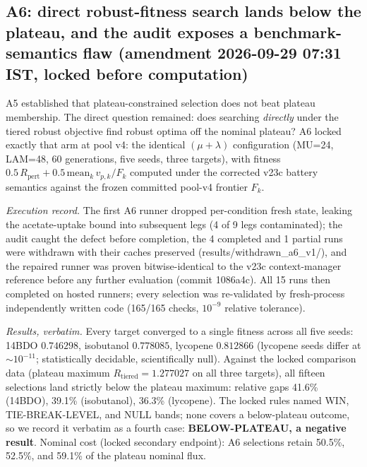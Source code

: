 \documentclass[12pt,a4paper]{article}
\begin{document}

\subsection{A6: direct robust-fitness search lands below the plateau, and the audit exposes a benchmark-semantics flaw (amendment 2026-09-29 07:31 IST, locked before computation)}
\label{sec:a6}

A5 established that plateau-constrained selection does not beat plateau membership. The direct question remained: does searching \emph{directly} under the tiered robust objective find robust optima off the nominal plateau? A6 locked exactly that arm at pool v4: the identical $(\mu{+}\lambda)$ configuration (MU=24, LAM=48, 60 generations, five seeds, three targets), with fitness $0.5\,R_{\mathrm{pert}} + 0.5\,\mathrm{mean}_k\, v_{p,k}/F_k$ computed under the corrected v23c battery semantics against the frozen committed pool-v4 frontier $F_k$.

\textit{Execution record.} The first A6 runner dropped per-condition fresh state, leaking the acetate-uptake bound into subsequent legs (4 of 9 legs contaminated); the audit caught the defect before completion, the 4 completed and 1 partial runs were withdrawn with their caches preserved (results/withdrawn\_a6\_v1/), and the repaired runner was proven bitwise-identical to the v23c context-manager reference before any further evaluation (commit 1086a4c). All 15 runs then completed on hosted runners; every selection was re-validated by fresh-process independently written code (165/165 checks, $10^{-9}$ relative tolerance).

\textit{Results, verbatim.} Every target converged to a single fitness across all five seeds: 14BDO $0.746298$, isobutanol $0.778085$, lycopene $0.812866$ (lycopene seeds differ at $\sim$$10^{-11}$; statistically decidable, scientifically null). Against the locked comparison data (plateau maximum $R_{\mathrm{tiered}} = 1.277027$ on all three targets), all fifteen selections land strictly below the plateau maximum: relative gaps 41.6\% (14BDO), 39.1\% (isobutanol), 36.3\% (lycopene). The locked rules named WIN, TIE-BREAK-LEVEL, and NULL bands; none covers a below-plateau outcome, so we record it verbatim as a fourth case: \textbf{BELOW-PLATEAU, a negative result}. Nominal cost (locked secondary endpoint): A6 selections retain 50.5\%, 52.5\%, and 59.1\% of the plateau nominal flux.
\end{document}
